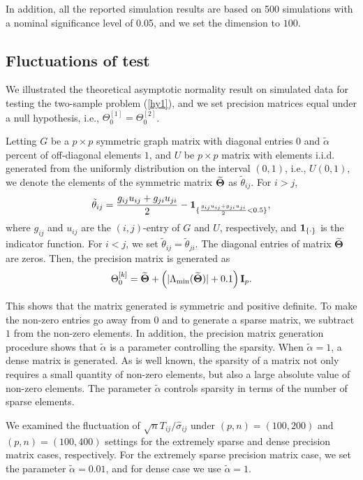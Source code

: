 \documentclass[review]{elsarticle}
\newcommand{\bbI}{{\bf I}}
\newcommand{\1}{{\bf 1}}
\newcommand{\0}{{\bf 0}}
\newcommand{\bqa}{\begin{eqnarray}}
\newcommand{\eqa}{\end{eqnarray}}
\begin{document}
 In addition, all the reported simulation results are based on 500 simulations with a nominal significance level of 0.05, and we set the dimension to $100$.

\subsection{Fluctuations of test}

 We illustrated the theoretical asymptotic normality result on simulated data for testing the two-sample problem (\ref{hy1}), and we set precision matrices equal under a null hypothesis, i.e., $\Theta_0^{[1]}=\Theta_0^{[2]}$.

 Letting $G$ be a $p\times p$ symmetric graph matrix with diagonal entries $0$ and $\tilde \alpha$ percent of off-diagonal elements $1$, and $U$ be $p\times p$ matrix with elements i.i.d. generated from the uniformly distribution on the interval $(0,1)$, i.e., $U(0,1)$, we
 denote the elements of the symmetric matrix $\widetilde{\bf \Theta}$ as $\tilde\theta_{ij}$. For $i>j$,
\bqa
\tilde\theta_{ij}=\frac{g_{ij}u_{ij}+g_{ji}u_{ji}}{2}-{\bf 1}_{\{\frac{g_{ij}u_{ij}+g_{ji}u_{ji}}{2}<0.5\}},
\eqa
 where $g_{ij}$ and $u_{ij}$ are the $(i,j)$-entry of $G$ and $U$, respectively, and ${\bf 1}_{\{\cdot\}}$ is the indicator function.
 For $i<j$, we set $\tilde\theta_{ij}=\tilde\theta_{ji}$.
 The diagonal entries of matrix $\widetilde{\bf \Theta}$ are zeros.
 Then, the precision matrix is generated as
\bqa\label{Thetagenerate}
\Theta_0^{[k]}=\widetilde{\bf \Theta}+\left(|\Lambda_{\mathrm{min}}(\widetilde{\bf \Theta})|+0.1\right)\bbI_p.
\eqa

 This shows that the matrix generated is symmetric and positive definite.
 To make the non-zero entries go away from $0$ and to generate a sparse matrix, we subtract $1$ from the non-zero elements.
 In addition, the precision matrix generation procedure shows that $\tilde \alpha$ is a parameter controlling the sparsity.
 When $\tilde \alpha=1$, a dense matrix is generated.
 As is well known, the sparsity of a matrix not only requires a small quantity of non-zero elements, but also a large absolute value of non-zero elements.
 The parameter $\tilde \alpha$ controls sparsity in terms of the number of sparse elements.

 We examined the fluctuation of $\sqrt{n}T_{ij}/\hat{\sigma}_{ij}$ under $(p,n)=(100,200)$ and $(p,n)=(100,400)$ settings for the extremely sparse and dense precision matrix cases, respectively.
 For the extremely sparse precision matrix case, we set the parameter $\tilde\alpha=0.01$, and for dense case we use $\tilde\alpha=1$.
\end{document}
